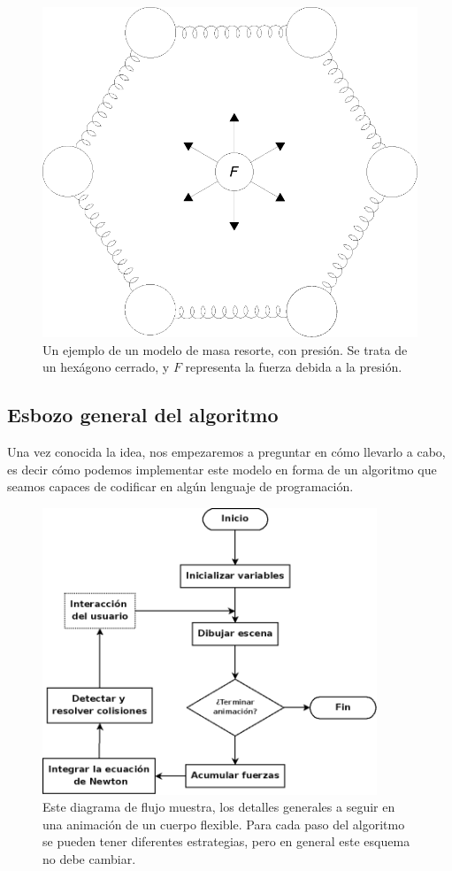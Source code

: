 \begin{figure}
 \centering
 \includegraphics[]{Img/modelo}
 \caption[Diagrama del modelo masa, resorte, y presión]{ 
 Un ejemplo de un modelo de masa resorte, con presión. Se trata de un hexágono cerrado, y $F$ representa la fuerza debida a la presión.
 } \label{modelo:fig}
\end{figure}

\subsection{Esbozo general del algoritmo}
Una vez conocida la idea, nos empezaremos a preguntar en cómo llevarlo a cabo, es decir cómo podemos implementar este modelo en forma de un algoritmo que seamos capaces de codificar en algún lenguaje de programación.


\begin{figure}
 \centering
 \includegraphics[width=10cm]{Img/diagrama_flujo}
 \caption[Diagrama de flujo de la simulación]{ 
 Este diagrama de flujo muestra, los detalles generales a seguir en una animación de un cuerpo flexible. Para cada paso del algoritmo se pueden tener diferentes estrategias, pero en general este esquema no debe cambiar.
 } \label{diagrama_flujo:fig}
\end{figure}

